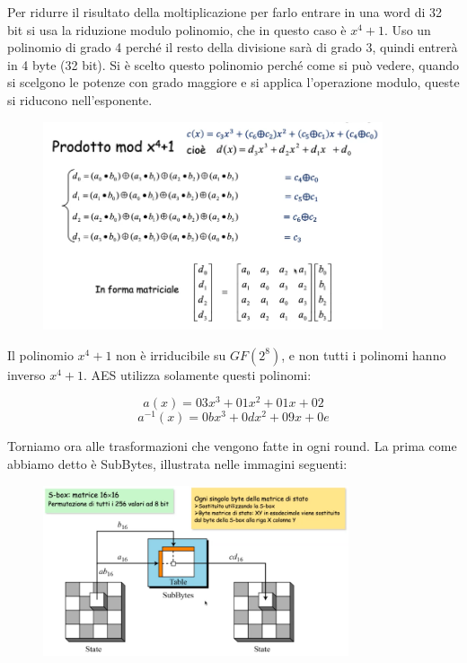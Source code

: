 Per ridurre il risultato della moltiplicazione per farlo entrare in una word di 32 bit si usa la riduzione modulo polinomio, che in questo caso è $x^{4} + 1$. Uso un polinomio di grado 4 perché il resto della divisione sarà di grado 3, quindi entrerà in 4 byte (32 bit). Si è scelto questo polinomio perché come si può vedere, quando si scelgono le potenze con grado maggiore e si applica l'operazione modulo, queste si riducono nell'esponente.

\begin{figure}[htb!]
    \centering
    \includegraphics[width=10cm]{./Images/cap1/1.23.png}
\end{figure} 

Il polinomio $x^{4} + 1$ non è irriducibile su $GF(2^{8})$, e non tutti i polinomi hanno inverso $x^{4} + 1$. AES utilizza solamente questi polinomi:

\[a(x) = 03 x^{3} + 01 x^{2} + 01 x + 02\]
\[a^{-1}(x) = 0b x^{3} + 0d x^{2} + 09 x + 0e\]

Torniamo ora alle trasformazioni che vengono fatte in ogni round. La prima come abbiamo detto è SubBytes, illustrata nelle immagini seguenti:

\begin{figure}[htb!]
    \centering
    \includegraphics[width=9cm]{./Images/cap1/1.24.png}
\end{figure} 

\begin{figure}[htb!]
    \centering
    \includegraphics[width=0cm]{./Images/cap1/1.25.png}
\end{figure} 

